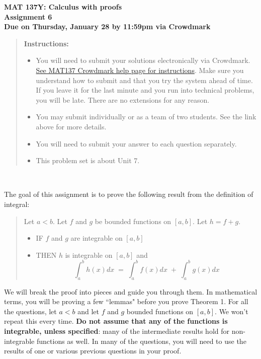 \documentclass[12pt]{exam}
\newcommand{\vv}{\vspace{.1cm}}
\begin{document}
{\large
	\begin{center}
		{\bf MAT 137Y: Calculus with proofs}\\
		{\bf Assignment 6} \\
		{\bf Due on Thursday, January 28 by 11:59pm via Crowdmark}
	\end{center}
}

\vv

\begin{quotation}
{\bf Instructions:}
	\begin{itemize}
		\item	 You will need to submit your solutions electronically via Crowdmark.   \href{https://www.math.toronto.edu/~alfonso/137/PS/137_CM.html}{See MAT137 Crowdmark help page for instructions}.  Make sure you understand how to submit and that you try the system ahead of time.  If you leave it for the last minute and you run into technical problems, you will be late.  There are no extensions for any reason.
		\item You may submit individually or as a team of two students.  See the link above for more details.
		\item  You will need to submit your answer to each question separately.
		\item  This problem set is about Unit 7.
	\end{itemize}
\end{quotation}

\


The goal of this assignment is to prove the following result from the definition of integral:
	\begin{quotation}
	Let $a<b$.  \; Let $f$ and $g$ be bounded functions on $[a,b]$.  Let $h = f+g$.
	\begin{itemize}
		\item  IF $f$ and $g$ are integrable on $[a,b]$
		\item  THEN $h$ is integrable on $[a,b]$ and
			$$
				\int_a^b h(x) dx \; = \;  \int_a^b f(x) dx \; + \; \int_a^b g(x) dx
			$$
	\end{itemize}
	\end{quotation}

We will break the proof into pieces and guide you through them.  In mathematical terms, you will be proving a few ``lemmas" before you prove Theorem 1.  For all the questions, let $a<b$ and let $f$ and $g$ bounded functions on $[a,b]$.  We won't repeat this every time.  {\bf Do not assume that any of the functions is integrable, unless specified}: many of the intermediate results hold for non-integrable functions as well.    In many of the questions, you will need to use the results of one or various previous questions in your proof.
\end{document}
